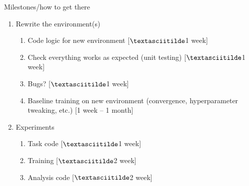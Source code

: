 \documentclass[bigger]{beamer}
\begin{document}
\begin{frame}[<+->][label={sec:orgd909bb6}]{Milestones/how to get there}
\begin{enumerate}
\item Rewrite the environment(s) 
\begin{enumerate}
\item Code logic for new environment \colorbox{black!15!white}{[$\textasciitilde$1 week]}
\item Check everything works as expected (unit testing) \colorbox{black!15!white}{[$\textasciitilde$1 week]}
\item Bugs? \colorbox{black!15!white}{[$\textasciitilde$1 week]}
\item Baseline training on new environment (convergence, hyperparameter tweaking, etc.)  \colorbox{black!15!white}{[1 week -- 1 month]}
\end{enumerate}
\item Experiments
\begin{enumerate}
\item Task code  \colorbox{black!15!white}{[$\textasciitilde$1 week]}
\item Training  \colorbox{black!15!white}{[$\textasciitilde$2 week]}
\item Analysis code  \colorbox{black!15!white}{[$\textasciitilde$2 week]}
\end{enumerate}
\end{enumerate}
\end{frame}
\end{document}
